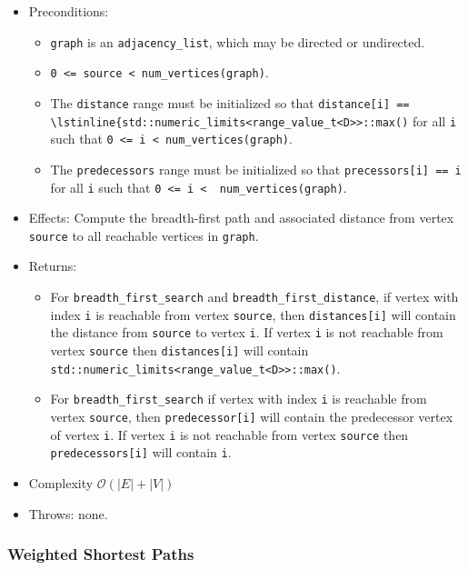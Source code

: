 \begin{itemize}
\item[] Preconditions:
\begin{itemize}
\item[]
\lstinline{graph} is an \lstinline{adjacency_list}, which may be directed or
undirected.
\item[]
\lstinline{0 <= source < num_vertices(graph)}.
\item[]
  The \lstinline{distance} range must be initialized so that 
    \lstinline{distance[i] == \lstinline{std::numeric_limits<range_value_t<D>>::max()} 
    for all \lstinline{i}
    such that \lstinline{0 <= i < num_vertices(graph)}.  
\item[]
  The \lstinline{predecessors} range must be initialized so that
  \lstinline{precessors[i] == i} for all \lstinline{i} such that 
  \lstinline{0 <= i <  num_vertices(graph)}.
\end{itemize}
\item[] 
Effects: Compute the breadth-first path and associated distance from vertex
\lstinline{source} to all reachable vertices in \lstinline{graph}.
\item[] 
Returns:
\begin{itemize}
\item[] For \lstinline{breadth_first_search} and \lstinline{breadth_first_distance},
  if vertex with index \lstinline{i} is reachable from vertex \lstinline{source}, then
  \lstinline{distances[i]} will contain the distance from \lstinline{source} to vertex
  \lstinline{i}.  If vertex \lstinline{i} is not reachable from vertex
  \lstinline{source} then \lstinline{distances[i]} will contain
  \lstinline{std::numeric_limits<range_value_t<D>>::max()}.
\item[]
For \lstinline{breadth_first_search} if vertex with index \lstinline{i} is reachable
from vertex \lstinline{source}, then \lstinline{predecessor[i]} will contain the
predecessor vertex of vertex \lstinline{i}.  If vertex \lstinline{i} is not reachable
from vertex \lstinline{source} then \lstinline{predecessors[i]} will contain
\lstinline{i}.
\end{itemize}
%
\item[] Complexity $\mathcal{O}(|E| + |V|)$
\item[] Throws: none. 
\end{itemize}



\subsubsection{Weighted Shortest Paths}

